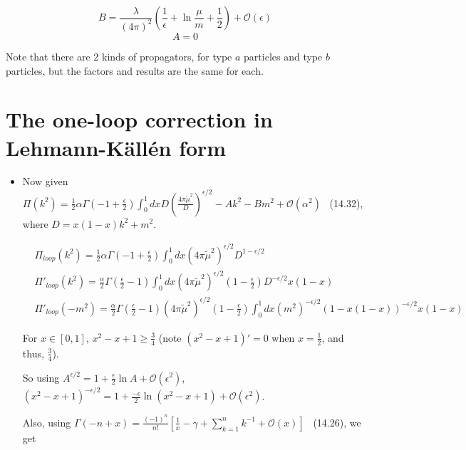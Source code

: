 \documentclass[twoside]{amsart}
\newcommand{\solutionhead}[1]
  {\smallskip
   \noindent{\large\bf Solution #1.}
   }
\begin{document}
\[
\boxed{ B =  \frac{\lambda}{  ( 4\pi)^2 } \left( \frac{1}{ \epsilon} + \ln{ \frac{ \mu}{m} } + \frac{1}{2} \right) + \mathcal{O}(\epsilon) }
\]
\[
\boxed{ A = 0}
\]

Note that there are 2 kinds of propagators, for type $a$ particles and type $b$ particles, but the factors and results are the same for each.  

\section{The one-loop correction in Lehmann-K\"all\'en form}


\solutionhead{15.1}
\begin{itemize}
\item[(a)] Now given $\Pi(k^2) = \frac{1}{2} \alpha \Gamma(-1 + \frac{ \epsilon}{2} ) \int_0^1 dx D \left( \frac{ 4\pi \widetilde{\mu}^2 }{ D } \right)^{\epsilon/2} - Ak^2 - Bm^2 + \mathcal{O}(\alpha^2)$ \quad \quad \,  (14.32), where $D = x(1-x) k^2 + m^2$.  

\[
\begin{aligned}
  & \Pi_{loop}(k^2) = \frac{1}{2} \alpha \Gamma( -1 + \frac{ \epsilon}{2} ) \int_0^1 dx ( 4\pi \widetilde{\mu}^2 )^{\epsilon/2} D^{1- \epsilon/2}  \\
  & \Pi'_{loop}(k^2) = \frac{ \alpha}{2} \Gamma\left( \frac{ \epsilon }{2} - 1 \right) \int_0^1 dx (4\pi \widetilde{\mu}^2 )^{\epsilon/2} \left( 1-  \frac{ \epsilon}{2} \right) D^{-\epsilon/2} x(1-x) \\ 
  & \Pi'_{loop}(-m^2) = \frac{ \alpha}{2} \Gamma\left( \frac{ \epsilon}{2} -1 \right) (4\pi \widetilde{\mu}^2)^{\epsilon/2} \left( 1 - \frac{ \epsilon}{2} \right) \int_0^1 dx (m^2)^{-\epsilon/2} (1 - x(1-x))^{- \epsilon/2} x(1-x)
\end{aligned}
\]

For $x \in [0,1]$, $x^2 - x+1 \geq \frac{3}{4}$ (note $(x^2 - x+1)'=0$ when $x= \frac{1}{2}$, and thus, $\frac{3}{4}$).  

So using $A^{\epsilon/2} = 1 + \frac{ \epsilon}{2} \ln{ A} + \mathcal{O}(\epsilon^2)$, $(x^2 - x+1)^{-\epsilon/2} = 1 + \frac{ - \epsilon }{2} \ln{ (x^2 - x +1) } + \mathcal{O}(\epsilon^2)$.  

Also, using $\Gamma(-n + x ) = \frac{ ( -1)^n}{n!} \left[ \frac{1}{x} - \gamma + \sum_{k=1}^n k^{-1} + \mathcal{O}(x) \right]$  \quad \, (14.26), we get


\end{itemize}
\end{document}
